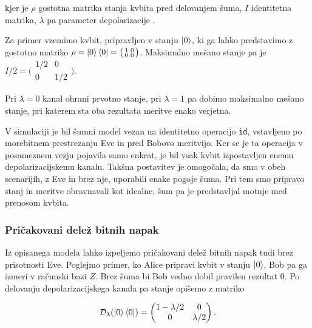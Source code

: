     kjer je $\rho$ gostotna matrika stanja kvbita pred delovanjem šuma, $I$ identitetna matrika, $\lambda$ pa parameter depolarizacije \cite{g22:aer-depolarizing}.

    Za primer vzemimo kvbit, pripravljen v stanju $\ket{0}$, ki ga lahko predstavimo z gostotno matriko
    $\rho=\ket{0}\bra{0}=
    \bigl(\begin{smallmatrix}
    1&0\\0&0
    \end{smallmatrix}\bigr)$.
    Maksimalno mešano stanje pa je
    $I/2=\bigl(\begin{smallmatrix}
    1/2&0\\0&1/2
    \end{smallmatrix}\bigr)$.

    Pri $\lambda=0$ kanal ohrani prvotno stanje, pri $\lambda=1$ pa dobimo maksimalno mešano stanje, pri katerem sta oba rezultata meritve enako verjetna.

    V simulaciji je bil šumni model vezan na identitetno operacijo \texttt{id}, vstavljeno po morebitnem prestrezanju Eve in pred Bobovo meritvijo.
    Ker se je ta operacija v posameznem vezju pojavila samo enkrat, je bil vsak kvbit izpostavljen enemu depolarizacijskemu kanalu.
    Takšna postavitev je omogočala, da smo v obeh scenarijih, z Eve in brez nje, uporabili enake pogoje šuma.
    Pri tem smo pripravo stanj in meritve obravnavali kot idealne, šum pa je predstavljal motnje med prenosom kvbita.

\subsubsection{Pričakovani delež bitnih napak}
\label{g22:sec:pricakovani-qber}


    Iz opisanega modela lahko izpeljemo pričakovani
    delež bitnih napak tudi brez prisotnosti Eve.
    Poglejmo primer, ko Alice pripravi kvbit v stanju
    $\ket{0}$, Bob pa ga izmeri v računski bazi $Z$.
    Brez šuma bi Bob vedno dobil pravilen rezultat $0$.
    Po delovanju depolarizacijskega kanala pa stanje
    opišemo z matriko

    \begin{equation}
        \mathcal{D}_{\lambda}(\ket{0}\bra{0})
        =
        \begin{pmatrix}
            1-\lambda/2 & 0 \\
            0 & \lambda/2
        \end{pmatrix}.
    \end{equation}


